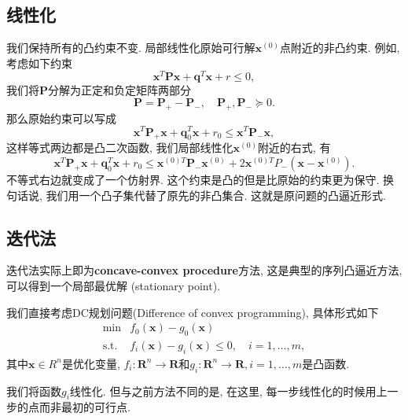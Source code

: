 \documentclass[a4paper,12pt]{article}
\begin{document}
\subsection{线性化}
我们保持所有的凸约束不变.
局部线性化原始可行解$\bm{x}^{(0)}$点附近的非凸约束.
例如, 考虑如下约束
\begin{equation}
\bm{x}^T \bm{P} \bm{x} + \bm{q}^T \bm{x} + r \leq 0,
\end{equation}
我们将$\bm{P}$分解为正定和负定矩阵两部分
\begin{equation}
\bm{P} = \bm{P}_{+} - \bm{P}_{-} , \quad \bm{P}_{+},\bm{P}_{-} \succeq 0.
\end{equation}
那么原始约束可以写成
\begin{equation}
\bm{x}^T \bm{P}_{+} \bm{x} + \bm{q}_0^T \bm{x} + r_0 \leq \bm{x}^T \bm{P}_{-} \bm{x},
\end{equation}
这样等式两边都是凸二次函数, 我们局部线性化$\bm{x}^{(0)}$附近的右式, 有
\begin{equation}
\bm{x}^T \bm{P}_{+} \bm{x} + \bm{q}_0^T \bm{x} + r_0 \leq \bm{x}^{(0)T} \bm{P}_{-} \bm{x}^{(0)} + 2\bm{x}^{(0)T} P_{-}(\bm{x}-\bm{x}^{(0)}).
\end{equation}
不等式右边就变成了一个仿射界. 
这个约束是凸的但是比原始的约束更为保守. 
换句话说, 我们用一个凸子集代替了原先的非凸集合. 
这就是原问题的凸逼近形式.

\subsection{迭代法}
迭代法实际上即为\textbf{concave-convex procedure}方法, 这是典型的序列凸逼近方法, 可以得到一个局部最优解 (stationary point).

我们直接考虑DC规划问题(Difference of convex programming), 具体形式如下
\begin{equation}
\begin{array}{cl}
{\min} & {f_0(\bm{x})-g_0(\bm{x})} \\
{\text{s.t.}} & {f_i(\bm{x})-g_i(\bm{x}) \leq 0, \quad i=1,\dots,m,}
\end{array}
\end{equation}
其中$\bm{x}\in R^n$是优化变量, $f_i:\bm{R}^n \rightarrow \bm{R}$和$g_i:\bm{R}^n \rightarrow \bm{R}, i=1,\dots,m$是凸函数.

我们将函数$g_i$线性化.
但与之前方法不同的是, 在这里, 每一步线性化的时候用上一步的点而非最初的可行点.
\end{document}

